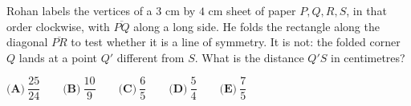 Rohan labels the vertices of a $3$ cm by $4$ cm sheet of paper $P,Q,R,S$, in that order clockwise, with $\overline{PQ}$ along a long side. He folds the rectangle along the diagonal $\overline{PR}$ to test whether it is a line of symmetry. It is not: the folded corner $Q$ lands at a point $Q'$ different from $S$. What is the distance $Q'S$ in centimetres?

$\textbf{(A)}\ \dfrac{25}{24}\qquad\textbf{(B)}\ \dfrac{10}9\qquad\textbf{(C)}\ \dfrac65\qquad\textbf{(D)}\ \dfrac54\qquad\textbf{(E)}\ \dfrac75$
